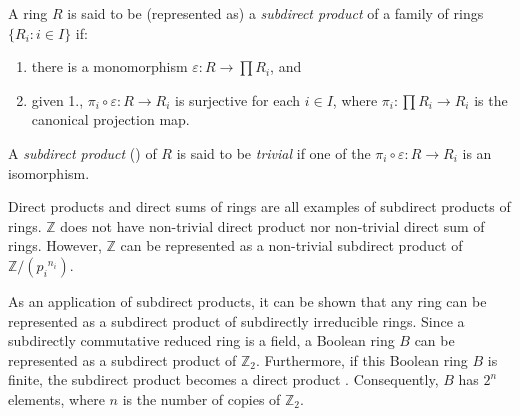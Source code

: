 \documentclass[12pt]{article}
\begin{document}
A ring $R$ is said to be (represented as) a \emph{subdirect product} of a family of rings $\lbrace R_i: i \in I \rbrace$ if:
\begin{enumerate}
\item
there is a monomorphism $\varepsilon: R \longrightarrow \prod R_i$, and
\item
given 1., $\pi_i \circ \varepsilon: R \longrightarrow R_i$ is surjective for each $i \in I$, where $\pi_i:\prod R_i \longrightarrow R_i$ is the canonical projection map.
\end{enumerate}

A \emph{subdirect product} () of $R$ is said to be \emph{trivial} if one of the $\pi_i \circ \varepsilon: R \longrightarrow R_i$ is an isomorphism.

Direct products and direct sums of rings are all examples of subdirect products of rings.  $\mathbb{Z}$ does not have non-trivial direct product nor non-trivial direct sum  of rings.  However, $\mathbb{Z}$ can be represented as a non-trivial subdirect product of $\mathbb{Z}/({p_i}^{n_i})$.

As an application of subdirect products, it can be shown that any ring can be represented as a subdirect product of subdirectly irreducible rings.  Since a subdirectly  commutative reduced ring is a field, a Boolean ring $B$ can be represented as a subdirect product of $\mathbb{Z}_2$.  Furthermore, if this Boolean ring $B$ is finite, the subdirect product  becomes a direct product .  Consequently, $B$ has $2^n$ elements, where $n$ is the number of copies of $\mathbb{Z}_2$.
\end{document}
